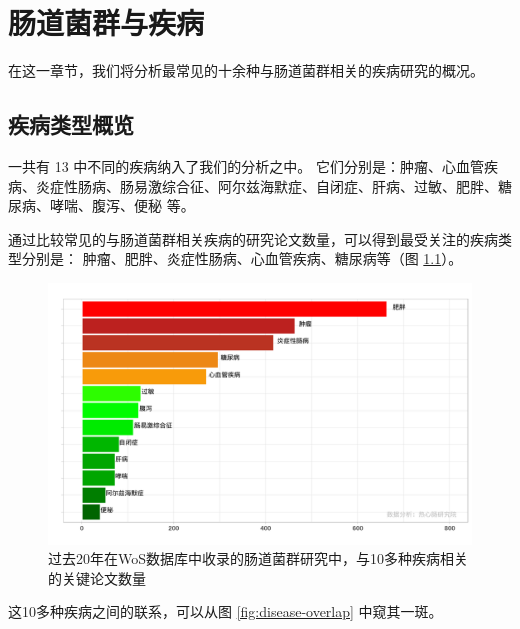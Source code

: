 \documentclass[]{ctexbook}
\begin{document}
\hypertarget{disease}{%
\chapter{肠道菌群与疾病}\label{disease}}

在这一章节，我们将分析最常见的十余种与肠道菌群相关的疾病研究的概况。

\hypertarget{ux75beux75c5ux7c7bux578bux6982ux89c8}{%
\section{疾病类型概览}\label{ux75beux75c5ux7c7bux578bux6982ux89c8}}

一共有 13 中不同的疾病纳入了我们的分析之中。
它们分别是：肿瘤、心血管疾病、炎症性肠病、肠易激综合征、阿尔兹海默症、自闭症、肝病、过敏、肥胖、糖尿病、哮喘、腹泻、便秘 等。

通过比较常见的与肠道菌群相关疾病的研究论文数量，可以得到最受关注的疾病类型分别是：
肿瘤、肥胖、炎症性肠病、心血管疾病、糖尿病等（图 \ref{fig:disease-research-count}）。

\begin{figure}
\includegraphics[width=1\linewidth]{plots/disease-research-count-1} \caption{过去20年在WoS数据库中收录的肠道菌群研究中，与10多种疾病相关的关键论文数量}\label{fig:disease-research-count}
\end{figure}

这10多种疾病之间的联系，可以从图 \ref{fig:disease-overlap} 中窥其一斑。
\end{document}
